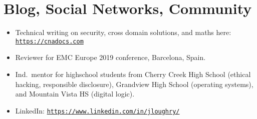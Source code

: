 \section*{Blog, Social Networks, Community}
\vspace{-3mm}

\begin{itemize}
    \item Technical writing on security, cross domain solutions, and maths
        here:
        \href{https://cnadocs.com}{\nolinkurl{https://cnadocs.com}}\vspace{-3mm}
    \item Reviewer for EMC Europe 2019 conference, Barcelona,
        Spain.\vspace{-3mm}
    \item Ind.\ mentor for highschool students from Cherry Creek High School
        (ethical hacking, responsible disclosure), Grandview High School
        (operating systems), and Mountain Vista HS (digital logic).\vspace{-3mm}
    \item LinkedIn:
        \href{https://www.linkedin.com/in/jloughry/}{\nolinkurl{https://www.linkedin.com/in/jloughry/}}
\end{itemize}

